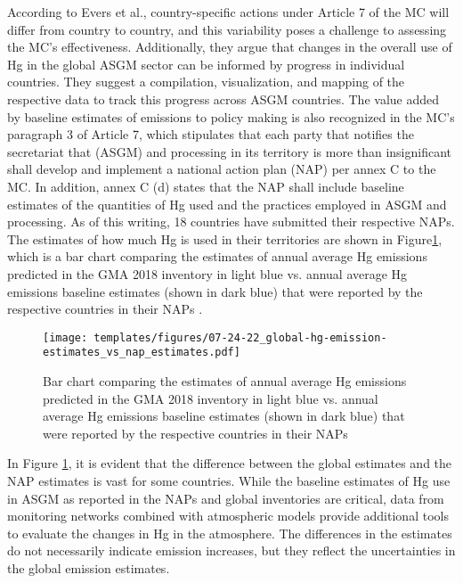 According to Evers et al.\cite{evers_evaluating_2016}, country-specific actions under Article 7 of the MC will differ from country to country, and this variability poses a challenge to assessing the MC's effectiveness. Additionally, they argue that changes in the overall use of Hg in the global ASGM sector can be informed by progress in individual countries. They suggest a compilation, visualization, and mapping of the respective data to track this progress across ASGM countries.  The value added by baseline estimates of emissions to policy making is also recognized in the MC's paragraph 3 of Article 7, which stipulates that each party that notifies the secretariat that (ASGM) and processing in its territory is more than insignificant shall develop and implement a national action plan (NAP) per annex C to the MC. In addition, annex C (d) states that the NAP shall include baseline estimates of the quantities of Hg used and the practices employed in ASGM and processing. As of this writing, 18 countries have submitted their respective NAPs. The estimates of how much Hg is used in their territories are shown in Figure\ref{fig:global-hg-emission-estimates_vs_nap_estimates}, which is a bar chart comparing the estimates of annual average Hg emissions predicted in the GMA 2018 inventory in light blue vs. annual average Hg emissions baseline estimates (shown in dark blue) that were reported by the respective countries in their NAPs \cite{united_nations_environment_programme_technical_2019}.

\begin{figure}[H]
  \texttt{[image: templates/figures/07-24-22\_global-hg-emission-estimates\_vs\_nap\_estimates.pdf]}
  \centering
  \caption{Bar chart comparing the estimates of annual average Hg emissions predicted in the GMA 2018 inventory in light blue vs. annual average Hg emissions baseline estimates (shown in dark blue) that were reported by the respective countries in their NAPs \cite{united_nations_environment_programme_technical_2019} }
  \label{fig:global-hg-emission-estimates_vs_nap_estimates}
\end{figure}
\FloatBarrier
\begin{flushleft}
 In Figure \ref{fig:global-hg-emission-estimates_vs_nap_estimates}, it is evident that the difference between the global estimates and the NAP estimates is vast for some countries. While the baseline estimates of Hg use in ASGM as reported in the NAPs and global inventories are critical, data from monitoring networks combined with atmospheric models provide additional tools to evaluate the changes in Hg in the atmosphere. The differences in the estimates do not necessarily indicate emission increases, but they reflect the uncertainties in the global emission estimates. 
\end{flushleft} 

